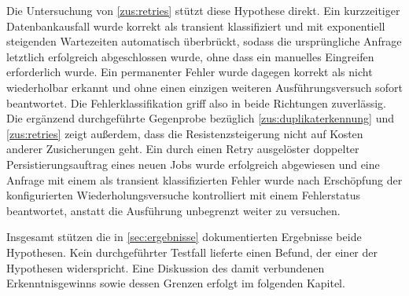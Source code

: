 Die Untersuchung von \ref{zus:retries} stützt diese Hypothese direkt.
Ein kurzzeitiger Datenbankausfall wurde korrekt als transient klassifiziert und mit exponentiell steigenden Wartezeiten
automatisch überbrückt, sodass die ursprüngliche Anfrage letztlich erfolgreich abgeschlossen wurde, ohne dass ein
manuelles Eingreifen erforderlich wurde.
Ein permanenter Fehler wurde dagegen korrekt als nicht wiederholbar erkannt und ohne einen einzigen weiteren Ausführungsversuch
sofort beantwortet.
Die Fehlerklassifikation griff also in beide Richtungen zuverlässig.
Die ergänzend durchgeführte Gegenprobe bezüglich \ref{zus:duplikaterkennung} und \ref{zus:retries} zeigt außerdem,
dass die Resistenzsteigerung nicht auf Kosten anderer Zusicherungen geht.
Ein durch einen Retry ausgelöster doppelter Persistierungsauftrag eines neuen Jobs wurde erfolgreich abgewiesen und eine
Anfrage mit einem als transient klassifizierten Fehler wurde nach Erschöpfung der konfigurierten Wiederholungsversuche
kontrolliert mit einem Fehlerstatus beantwortet, anstatt die Ausführung unbegrenzt weiter zu versuchen.

Insgesamt stützen die in \cref{sec:ergebnisse} dokumentierten Ergebnisse beide Hypothesen.
Kein durchgeführter Testfall lieferte einen Befund, der einer der Hypothesen widerspricht.
Eine Diskussion des damit verbundenen Erkenntnisgewinns sowie dessen Grenzen erfolgt im folgenden Kapitel.
